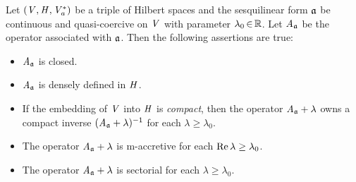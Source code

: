 \documentclass[11pt,twoside]{article}
\begin{document}
\begin{theorem1}\label{QUASI-COERCIVE_FORMS_AND_ASSOCIATED_OPERATORS}
Let $(\mathit{V},\mathit{H},\mathit{V}_a^*)$ be a triple of Hilbert spaces
and the sesquilinear form $\mathfrak{a}$ be continuous and quasi-coercive
on $\mathit{V}$ with parameter $\lambda_0 {\,\in\,} {\mathbb{R}}$.
Let $\mathit{A}_{\mathfrak{a}}$ be the operator associated with $\mathfrak{a}$.
Then the following assertions are true:

\begin{itemize}[leftmargin=9mm]
\item[(a)]
$\mathit{A}_{\mathfrak{a}}$ is closed.

\item[(b)]
$\mathit{A}_{\mathfrak{a}}$ is densely defined in $\mathit{H}$.

\item[(c)]
If the embedding of $\mathit{V}$ into $\mathit{H}$ is \textit{compact},
then the operator $\mathit{A}_{\mathfrak{a}} + \lambda$
owns a compact inverse $(\mathit{A}_{\mathfrak{a}} +\lambda)^{-1}$
for each $\lambda \geq \lambda_0$.

\item[(d)]
The operator $\mathit{A}_{\mathfrak{a}} + \lambda$ is m-accretive
for each $\operatorname{Re} \lambda \geq \lambda_0$.

\item[(e)]
The operator $\mathit{A}_{\mathfrak{a}} + \lambda$ is sectorial
for each $\lambda \geq \lambda_0$.
\end{itemize}
\end{theorem1}
\end{document}
